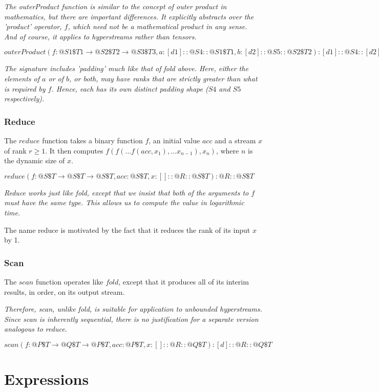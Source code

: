 \documentclass{article}
\begin{document}
{\em
The outerProduct function is similar to the concept of outer product in mathematics, but there are important differences. It explicitly abstracts over the 'product' operator, $f$, which need not be a mathematical product in any sense. And of course, it applies to hyperstreams rather than tensors.
}

$outerProduct(f: @S1 \$T1 \to{} @S2 \$T2 \to{} @S3 \$T3, a: [d1]::@S4::@S1 \$T1, b: [d2]::@S5::@S2 \$T2): [d1]::@S4::[d2]::@S5::@S3 \$T3$

{\em
The signature includes 'padding' much like that of fold above. Here, either the elements of $a$ or of $b$, or both, may have ranks that are strictly greater than what is required by $f$.
Hence, each has its own distinct padding shape ($S4$ and $S5$ respectively).
}


\subsubsection{Reduce}
\label{reduce}

The $reduce$ function takes a binary function $f$, an initial value $acc$ and a stream $x$ of rank $r \ge 1$. It then computes
$f(f( \ldots f(acc, x_1), \ldots x_{n-1}), x_n)$, where $n$ is the dynamic size of $x$.

$reduce(f: @S \$T \to{} @S \$T \to{} @S \$T, acc: @S \$T, x:[]::@R::@S \$T): @R::@S \$T$

{\em
Reduce works just like fold, except that we insist that both of the arguments to $f$ must have the same type. This allows us to compute the
value in logarithmic time.

The name reduce is motivated by the fact that it reduces the rank of its input $x$ by 1.
}

\subsubsection{Scan}
\label{scan}

The $scan$ function operates like $fold$, except that it produces all of its interim results, in order, on its output stream. 

{\em 
Therefore, scan, unlike fold, is suitable for application to unbounded hyperstreams. Since scan is inherently sequential, there is no justification for a separate version analogous to reduce.
}

$scan(f: @P \$T \to{} @Q \$T \to{} @P \$T, acc: @P \$T, x:[]::@R::@Q \$T):[d]::@R::@Q \$T$


\section{Expressions}
\label{expressions}
\end{document}
